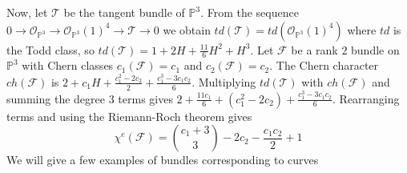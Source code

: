 \documentclass[
	oldfontcommands,
	sumario=abnt-6027-2012,
	12pt,			%
	openright,		%
	oneside,		%
	a4paper,		%
	english,		%
	brazil			%
	]{imecc-unicamp}
\begin{document}
Now, let $\mathcal{T}$ be the tangent bundle of $\mathbb{P}^3$. From the sequence $0 \to \mathcal{O}_{\mathbb{P}^3} \to \mathcal{O}_{\mathbb{P}^3}(1)^{4} \to \mathcal{T} \to 0$ we obtain $td(\mathcal{T})=td(\mathcal{O}_{\mathbb{P}^3}(1)^{4})$ where $td$ is the Todd class, so $td(\mathcal{T})=1+2H+\frac{11}{6}H^2+H^3$. Let $\mathcal{F}$ be a rank $2$ bundle on $\mathbb{P}^3$ with Chern classes $c_1(\mathcal{F})=c_1$ and $c_2(\mathcal{F})=c_2$. The Chern character $ch(\mathcal{F})$ is $2+c_1H+\frac{c_1^2-2c_2}{2}+\frac{c_1^3-3c_1 c_2}{6}$. Multiplying $td(\mathcal{T})$ with $ch(\mathcal{F})$ and summing the degree $3$ terms gives $2+\frac{11c_1}{6}+(c_1^2-2c_2)+\frac{c_1^3-3c_1c_2}{6}$. Rearranging terms and using the Riemann-Roch theorem gives
\begin{equation}\label{riemannroch}
\chi^e(\mathcal{F})={{c_1+3}\choose{3}}-2c_2-\frac{c_1c_2}{2}+1
\end{equation}
We will give a few examples of bundles corresponding to curves
\end{document}
